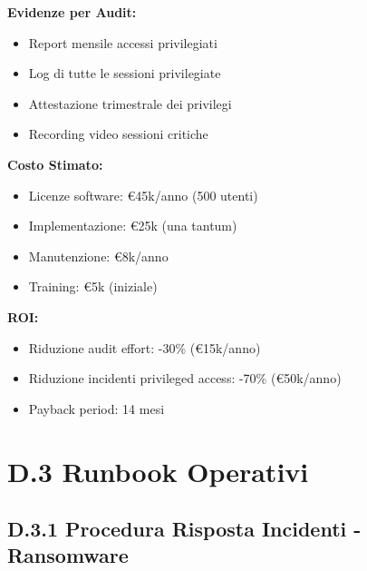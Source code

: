 \begin{tcolorbox}
\textbf{Evidenze per Audit:}
\begin{itemize}
    \item Report mensile accessi privilegiati
    \item Log di tutte le sessioni privilegiate
    \item Attestazione trimestrale dei privilegi
    \item Recording video sessioni critiche
\end{itemize}

\textbf{Costo Stimato:}
\begin{itemize}
    \item Licenze software: €45k/anno (500 utenti)
    \item Implementazione: €25k (una tantum)
    \item Manutenzione: €8k/anno
    \item Training: €5k (iniziale)
\end{itemize}

\textbf{ROI:}
\begin{itemize}
    \item Riduzione audit effort: -30\% (€15k/anno)
    \item Riduzione incidenti privileged access: -70\% (€50k/anno)
    \item Payback period: 14 mesi
\end{itemize}
\end{tcolorbox}

\section{\texorpdfstring{\textbf{D.3 Runbook Operativi}}{D.3 - Runbook Operativi}}

\subsection{\texorpdfstring{\textbf{D.3.1 Procedura Risposta Incidenti - Ransomware}}{D.3.1 - Procedura Risposta Incidenti - Ransomware}}

